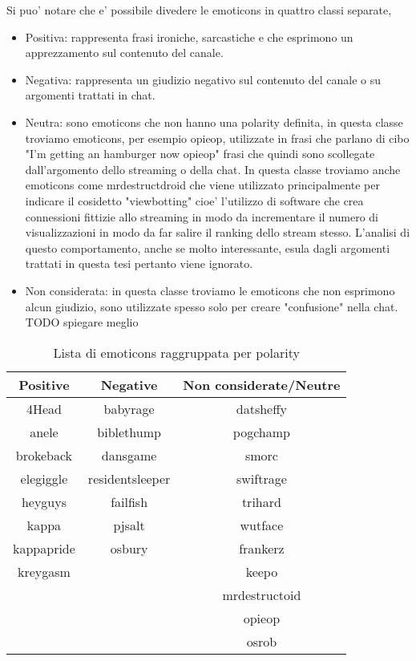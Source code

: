 \documentclass[a4paper,11pt]{book}
\theoremstyle{definition}
\begin{document}
Si puo' notare che e' possibile divedere le emoticons in quattro classi separate, 
\begin{itemize}
\item Positiva: rappresenta frasi ironiche, sarcastiche e che esprimono un apprezzamento sul contenuto del canale.
\item Negativa: rappresenta un giudizio negativo sul contenuto del canale o su argomenti trattati in chat.
\item Neutra: sono emoticons che non hanno una polarity definita, in questa classe troviamo emoticons, per esempio opieop, utilizzate in frasi che parlano di cibo "I'm getting an hamburger now opieop" frasi che quindi sono scollegate dall'argomento dello streaming o della chat. In questa classe troviamo anche emoticons come mrdestructdroid che viene utilizzato principalmente per indicare il cosidetto "viewbotting" cioe' l'utilizzo di software che crea connessioni fittizie allo streaming in modo da incrementare il numero di visualizzazioni in modo da far salire il ranking dello stream stesso. L'analisi di questo comportamento, anche se molto interessante, esula dagli argomenti trattati in questa tesi pertanto viene ignorato.
\item Non considerata: in questa classe troviamo le emoticons che non esprimono alcun giudizio, sono utilizzate spesso solo per creare "confusione" nella chat. TODO spiegare meglio
\end{itemize}

\begin{table}[h]
\begin{center}
\begin{tabular}{|c|c|c|}
\hline
Positive & Negative & Non considerate/Neutre \\
\hline
4Head & babyrage & datsheffy \\
\hline
anele &  biblethump &  pogchamp \\
\hline
brokeback &  dansgame & smorc \\
\hline
elegiggle & residentsleeper &  swiftrage \\
\hline
heyguys & failfish & trihard \\
\hline
kappa & pjsalt & wutface \\
\hline
kappapride & osbury & frankerz \\
\hline
kreygasm &  & keepo \\
\hline
 & & mrdestructoid \\
\hline
& & opieop \\
\hline
& & osrob \\
\hline
\end{tabular}
\end{center}
\caption{Lista di emoticons raggruppata per polarity}
\label{tab:emoticons2}
\end{table}
\end{document}
